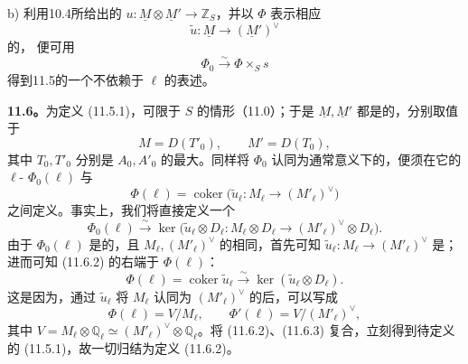 b) 利用10.4所给出的 $u:\underline M\otimes\underline M'\longrightarrow\mathbb Z_S$，并以 $\Phi$ 表示相应
\[
 \widetilde u:\underline M\longrightarrow(\underline M')^\vee
\]
的，
便可用
\begin{equation}\tag{11.5.3}
 \Phi_0\xrightarrow{\sim}\Phi\times_Ss
\end{equation}
得到11.5的一个不依赖于 $\ell$ 的表述。

\textbf{11.6。}为定义 (11.5.1)，可限于 $S$ 的情形（11.0）；于是 $\underline M,\underline M'$ 都是的，分别取值于
\begin{equation}\tag{11.6.1}
 M=D(T'_0),\qquad M'=D(T_0),
\end{equation}
其中 $T_0,T'_0$ 分别是 $A_0,A'_0$ 的最大。同样将 $\Phi_0$ 认同为通常意义下的，便须在它的 $\ell$- $\Phi_0(\ell)$ 与
\[
 \Phi(\ell)=\operatorname{coker}\bigl(\widetilde u_\ell:M_\ell\longrightarrow(M'_\ell)^\vee\bigr)
\]
之间定义。事实上，我们将直接定义一个
\begin{equation}\tag{11.6.2}
 \Phi_0(\ell)\xrightarrow{\sim}
 \ker\bigl(\widetilde u_\ell\otimes D_\ell:
 M_\ell\otimes D_\ell\longrightarrow(M'_\ell)^\vee\otimes D_\ell\bigr).
\end{equation}
由于 $\Phi_0(\ell)$ 是的，且 $M_\ell,(M'_\ell)^\vee$ 的相同，首先可知 $\widetilde u_\ell:M_\ell\longrightarrow(M'_\ell)^\vee$ 是；进而可知 (11.6.2) 的右端于 $\Phi(\ell)$：
\begin{equation}\tag{11.6.3}
 \Phi(\ell)=\operatorname{coker}\widetilde u_\ell
 \xrightarrow{\sim}\ker(\widetilde u_\ell\otimes D_\ell).
\end{equation}
这是因为，通过 $\widetilde u_\ell$ 将 $M_\ell$ 认同为 $(M'_\ell)^\vee$ 的后，可以写成
\[
 \Phi(\ell)=V/M_\ell,\qquad \Phi'(\ell)=V/(M'_\ell)^\vee,
\]
其中 $V=M_\ell\otimes\mathbb Q_\ell\simeq(M'_\ell)^\vee\otimes\mathbb Q_\ell$。将 (11.6.2)、(11.6.3) 复合，立刻得到待定义的 (11.5.1)，故一切归结为定义 (11.6.2)。


